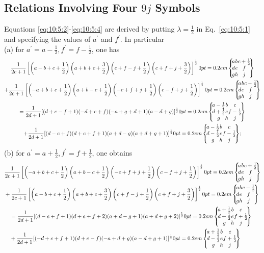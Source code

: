 \subsection{Relations Involving Four $9 j$ Symbols}\label{sec:10.5.2}
Equations \eqref{eq:10:5:2}-\eqref{eq:10:5:4} are derived by putting $\lambda=\frac{1}{2}$ in Eq.~\eqref{eq:10:5:1} and specifying the values of $a^{\prime}$ and $f^{\prime}$. In particular\\
(a) for $a^{\prime}=a-\frac{1}{2}, f^{\prime}=f-\frac{1}{2}$, one has
\begin{gather}
\frac{1}{2 c+1}\left[\left(a-b+c+\frac{1}{2}\right)\left(a+b+c+\frac{3}{2}\right)\left(c+f-j+\frac{1}{2}\right)\left(c+f+j+\frac{3}{2}\right)\right]^{\frac{1}{2}}\ninej{a}{b}{c+\frac{1}{2}}{d}{e}{f}{g}{h}{j}  \notag\\
+\frac{1}{2 c+1}\left[\left(-a+b+c+\frac{1}{2}\right)\left(a+b-c+\frac{1}{2}\right)\left(-c+f+j+\frac{1}{2}\right)\left(c-f+j+\frac{1}{2}\right)\right]^{\frac{1}{2}}\ninej{a}{b}{c-\frac{1}{2}}{d}{e}{f}{g}{h}{j}  \notag\\
=\frac{1}{2 d+1}[(d+e-f+1)(-d+e+f)(-a+g+d+1)(a-d+g)]^{\frac{1}{2}}\ninej{a-\frac{1}{2}}{b}{c}{d+\frac{1}{2}}{e}{f-\frac{1}{2}}{g}{h}{j}  \notag\\
+\frac{1}{2 d+1}[(d-e+f)(d+e+f+1)(a+d-g)(a+d+g+1)]^{\frac{1}{2}}\ninej{a-\frac{1}{2}}{b}{c}{d-\frac{1}{2}}{e}{f-\frac{1}{2}}{g}{h}{j} ; \label{eq:10:5:2}
\end{gather}
(b) for $a^{\prime}=a+\frac{1}{2}, f^{\prime}=f+\frac{1}{2}$, one obtains
\begin{align}
& \frac{1}{2 c+1}\left[\left(-a+b+c+\frac{1}{2}\right)\left(a+b-c+\frac{1}{2}\right)\left(-c+f+j+\frac{1}{2}\right)\left(c-f+j+\frac{1}{2}\right)\right]^{\frac{1}{2}}\ninej{a}{b}{c+\frac{1}{2}}{d}{e}{f}{g}{h}{j}  \notag\\
& +\frac{1}{2 c+1}\left[\left(a-b+c+\frac{1}{2}\right)\left(a+b+c+\frac{3}{2}\right)\left(c+f-j+\frac{1}{2}\right)\left(c+f+j+\frac{3}{2}\right)\right]^{\frac{1}{2}}\ninej{a}{b}{c-\frac{1}{2}}{d}{e}{f}{g}{h}{j}  \notag\\
& \quad=\frac{1}{2 d+1}[(d-e+f+1)(d+e+f+2)(a+d-g+1)(a+d+g+2)]^{\frac{1}{2}}\ninej{a+\frac{1}{2}}{b}{c}{d+\frac{1}{2}}{e}{f+\frac{1}{2}}{g}{h}{j}  \notag\\
& \quad+\frac{1}{2 d+1}[(-d+e+f+1)(d+e-f)(-a+d+g)(a-d+g+1)]^{\frac{1}{2}}\ninej{a+\frac{1}{2}}{b}{c}{d-\frac{1}{2}}{e}{f+\frac{1}{2}}{g}{h}{j} \label{eq:10:5:3}
\end{align}
